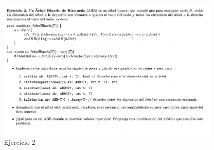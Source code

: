 \documentclass[10pt,a4paper]{article}
\begin{document}
\newpage

\begin{figure}[h]
  \centering
  \includegraphics[width=\textwidth]{images/guia_7_ej_2.png}
  \caption{Ejercicio 2}
  \label{fig:ej_2}
\end{figure}
\end{document}
